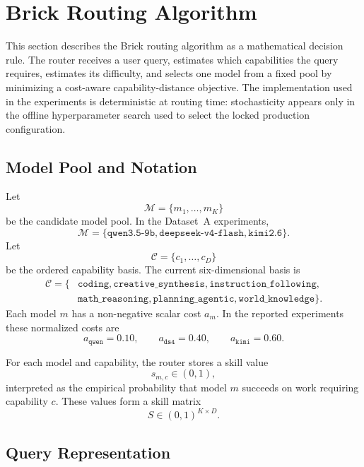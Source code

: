 
\section{Brick Routing Algorithm}
\label{sec:brick-routing-algorithm}

This section describes the Brick routing algorithm as a mathematical decision
rule. The router receives a user query, estimates which capabilities the query
requires, estimates its difficulty, and selects one model from a fixed pool by
minimizing a cost-aware capability-distance objective. The implementation used
in the experiments is deterministic at routing time: stochasticity appears only
in the offline hyperparameter search used to select the locked production
configuration.

\subsection{Model Pool and Notation}
\label{sec:brick-notation}

Let
\[
  \mathcal{M}=\{m_1,\ldots,m_K\}
\]
be the candidate model pool. In the Dataset~A experiments,
\[
  \mathcal{M} =
  \{\texttt{qwen3.5-9b},\texttt{deepseek-v4-flash},\texttt{kimi2.6}\}.
\]
Let
\[
  \mathcal{C}=\{c_1,\ldots,c_D\}
\]
be the ordered capability basis. The current six-dimensional basis is
\[
\begin{split}
\mathcal{C}=\{&
\texttt{coding},\texttt{creative\_synthesis},
\texttt{instruction\_following},\\
&\texttt{math\_reasoning},\texttt{planning\_agentic},
\texttt{world\_knowledge}\}.
\end{split}
\]
Each model \(m\) has a non-negative scalar cost \(a_m\). In the reported
experiments these normalized costs are
\[
  a_{\texttt{qwen}}=0.10,\qquad
  a_{\texttt{ds4}}=0.40,\qquad
  a_{\texttt{kimi}}=0.60.
\]

For each model and capability, the router stores a skill value
\[
  s_{m,c}\in(0,1),
\]
interpreted as the empirical probability that model \(m\) succeeds on work
requiring capability \(c\). These values form a skill matrix
\[
  S\in(0,1)^{K\times D}.
\]

\subsection{Query Representation}
\label{sec:brick-query-representation}

